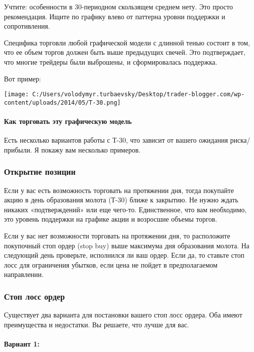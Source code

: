 \documentclass[a5paper]{article}
\begin{document}
Учтите: особенности в 30-периодном скользящем среднем нету. Это просто рекомендация. Ищите по графику влево от паттерна уровни поддержки и сопротивления.

Специфика торговли любой графической модели с длинной тенью состоит в том, что ее объем торгов должен быть выше предыдущих свечей. Это подтверждает, что многие трейдеры были выброшены, и сформировалась поддержка.

Вот пример:

\texttt{[image: C:/Users/volodymyr.turbaevsky/Desktop/trader-blogger.com/wp-content/uploads/2014/05/T-30.png]}

\paragraph{Как торговать эту графическую модель}

Есть несколько вариантов работы с Т-30, что зависит от вашего ожидания
риска/прибыли. Я покажу вам несколько примеров.

\subsubsection{Открытие позиции}

Если у вас есть возможность торговать на протяжении дня, тогда покупайте акцию в день образования молота (Т-30) ближе к закрытию. Не нужно ждать никаких «подтверждений» или еще чего-то. Единственное, что вам необходимо, это уровень поддержки на графике акции и возросшие объемы торгов.

Если у вас нет возможности торговать на протяжении дня, то расположите покупочный стоп ордер (stop buy) выше максимума дня образования молота. На следующий день проверьте, исполнился ли ваш ордер. Если да, то ставьте стоп лосс для ограничения убытков, если цена не пойдет в предполагаемом направлении.

\subsubsection{Стоп лосс ордер}

Существует два варианта для постановки вашего стоп лосс ордера. Оба
имеют преимущества и недостатки. Вы решаете, что лучше для вас.

\paragraph{Вариант 1:}
\end{document}
